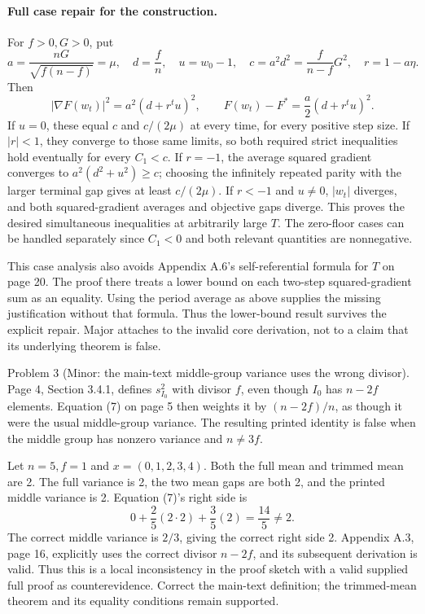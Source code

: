 \documentclass[10pt]{article}
\begin{document}
\paragraph*{Full case repair for the construction.}\mbox{}\par
For \(f>0,G>0\), put \[a=\frac{nG}{\sqrt{f(n-f)}}=\mu,\quad
 d=\frac fn,\quad u=w_0-1,\quad
 c=a^2d^2=\frac{f}{n-f}G^2,\quad r=1-a\eta.\] Then \[|\nabla F(w_t)|^2=a^2(d+r^tu)^2,\qquad
 F(w_t)-F^*=\frac a2(d+r^tu)^2 .\] If \(u=0\), these equal \(c\) and \(c/(2\mu)\) at every time, for every positive step size. If \(|r|<1\), they converge to those same limits, so both required strict inequalities hold eventually for every \(C_1<c\). If \(r=-1\), the average squared gradient converges to \(a^2(d^2+u^2)\geq c\); choosing the infinitely repeated parity with the larger terminal gap gives at least \(c/(2\mu)\). If \(r<-1\) and \(u\ne0\), \(|w_t|\) diverges, and both squared-gradient averages and objective gaps diverge. This proves the desired simultaneous inequalities at arbitrarily large \(T\). The zero-floor cases can be handled separately since \(C_1<0\) and both relevant quantities are nonnegative.\par
This case analysis also avoids Appendix A.6’s self-referential formula for \(T\) on page 20. The proof there treats a lower bound on each two-step squared-gradient sum as an equality. Using the period average as above supplies the missing justification without that formula. Thus the lower-bound result survives the explicit repair. Major attaches to the invalid core derivation, not to a claim that its underlying theorem is false.\par
Problem 3 (Minor: the main-text middle-group variance uses the wrong divisor).  Page 4, Section 3.4.1, defines \(s_{I_0}^2\) with divisor \(f\), even though \(I_0\) has \(n-2f\) elements. Equation (7) on page 5 then weights it by \((n-2f)/n\), as though it were the usual middle-group variance. The resulting printed identity is false when the middle group has nonzero variance and \(n\ne3f\).\par
Let \(n=5,f=1\) and \(x=(0,1,2,3,4)\). Both the full mean and trimmed mean are 2. The full variance is 2, the two mean gaps are both 2, and the printed middle variance is 2. Equation (7)’s right side is \[0+\frac25(2\cdot2)+\frac35(2)=\frac{14}{5}\ne2 .\] The correct middle variance is \(2/3\), giving the correct right side 2. Appendix A.3, page 16, explicitly uses the correct divisor \(n-2f\), and its subsequent derivation is valid. Thus this is a local inconsistency in the proof sketch with a valid supplied full proof as counterevidence. Correct the main-text definition; the trimmed-mean theorem and its equality conditions remain supported.\par
\end{document}
